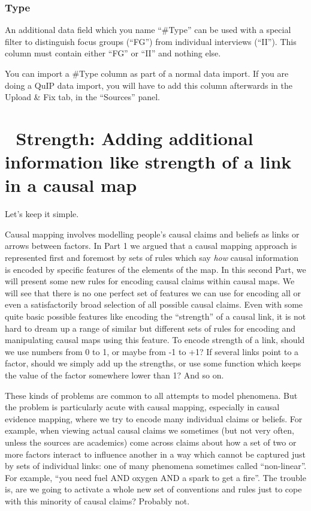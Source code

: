 \documentclass[
]{book}
\begin{document}
\hypertarget{type}{%
\subsection{Type}\label{type}}

An additional data field which you name ``\#Type'' can be used with a special filter to distinguish focus groups (``FG'') from individual interviews (``II''). This column must contain either ``FG'' or ``II'' and nothing else.

You can import a \#Type column as part of a normal data import. If you are doing a QuIP data import, you will have to add this column afterwards in the Upload \& Fix tab, in the ``Sources'' panel.

\hypertarget{strength-adding-additional-information-like-strength-of-a-link-in-a-causal-map}{%
\chapter{🧠 Strength: Adding additional information like strength of a link in a causal map}\label{strength-adding-additional-information-like-strength-of-a-link-in-a-causal-map}}

Let's keep it simple.

Causal mapping involves modelling people's causal claims and beliefs as links or arrows between factors. In Part 1 we argued that a causal mapping approach is represented first and foremost by sets of rules which say \emph{how} causal information is encoded by specific features of the elements of the map. In this second Part, we will present some new rules for encoding causal claims within causal maps. We will see that there is no one perfect set of features we can use for encoding all or even a satisfactorily broad selection of all possible causal claims. Even with some quite basic possible features like encoding the ``strength'' of a causal link, it is not hard to dream up a range of similar but different sets of rules for encoding and manipulating causal maps using this feature. To encode strength of a link, should we use numbers from 0 to 1, or maybe from -1 to +1? If several links point to a factor, should we simply add up the strengths, or use some function which keeps the value of the factor somewhere lower than 1? And so on.

These kinds of problems are common to all attempts to model phenomena. But the problem is particularly acute with causal mapping, especially in causal evidence mapping, where we try to encode many individual claims or beliefs. For example, when viewing actual causal claims we sometimes (but not very often, unless the sources are academics) come across claims about how a set of two or more factors interact to influence another in a way which cannot be captured just by sets of individual links: one of many phenomena sometimes called ``non-linear''. For example, ``you need fuel AND oxygen AND a spark to get a fire''. The trouble is, are we going to activate a whole new set of conventions and rules just to cope with this minority of causal claims? Probably not.
\end{document}

